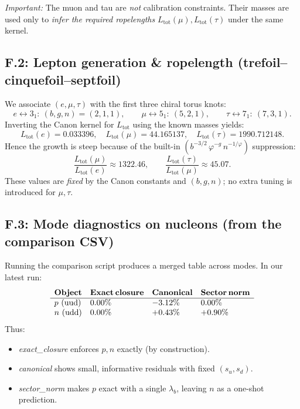 \documentclass[11pt, preprint,titlepage]{revtex4-2}
\begin{document}
		\emph{Important:} The muon and tau are \emph{not} calibration constraints. Their masses are used only to \emph{infer the required ropelengths} \(L_{\text{tot}}(\mu),L_{\text{tot}}(\tau)\) under the same kernel.

		\subsection*{F.2: Lepton generation \& ropelength (trefoil–cinquefoil–septfoil)}
		We associate \((e,\mu,\tau)\) with the first three chiral torus knots:
		\[
		e \leftrightarrow 3_1:\ (b,g,n)=(2,1,1),\qquad
		\mu \leftrightarrow 5_1:\ (5,2,1),\qquad
		\tau \leftrightarrow 7_1:\ (7,3,1).
		\]
		Inverting the Canon kernel for \(L_{\text{tot}}\) using the known masses yields:\footnotesize
		\[
		L_{\text{tot}}(e)=0.033396,\quad
		L_{\text{tot}}(\mu)=44.165137,\quad
		L_{\text{tot}}(\tau)=1990.712148.
		\]
		\normalsize
		Hence the growth is steep because of the built-in \((b^{-3/2}\,\varphi^{-g}\,n^{-1/\varphi})\) suppression:
		\[
		\frac{L_{\text{tot}}(\mu)}{L_{\text{tot}}(e)}\approx 1322.46,\qquad
		\frac{L_{\text{tot}}(\tau)}{L_{\text{tot}}(\mu)}\approx 45.07.
		\]
		These values are \emph{fixed} by the Canon constants and \((b,g,n)\); no extra tuning is introduced for \(\mu,\tau\).

		\subsection*{F.3: Mode diagnostics on nucleons (from the comparison CSV)}
		Running the comparison script produces a merged table across modes. In our latest run:
		\[
		\begin{array}{llll}
		\textbf{Object} & \textbf{Exact\,closure} & \textbf{Canonical} & \textbf{Sector\,norm} \\
		\hline
		p\ (\text{uud}) & 0.00\% & {-}3.12\% & 0.00\% \\
		n\ (\text{udd}) & 0.00\% & {+}0.43\% & {+}0.90\% \\
		\end{array}
		\]
		Thus:
		\begin{itemize}
		\item \textit{exact\_closure} enforces \(p,n\) exactly (by construction).
		\item \textit{canonical} shows small, informative residuals with fixed \((s_u,s_d)\).
		\item \textit{sector\_norm} makes \(p\) exact with a single \(\lambda_b\), leaving \(n\) as a one-shot prediction.
		\end{itemize}
\end{document}
